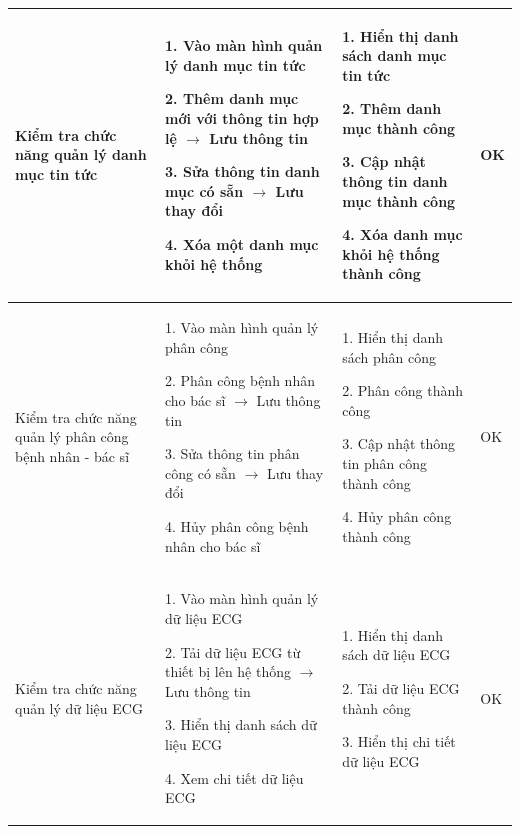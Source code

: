 \begin{xltabular}{\textwidth}{
  | >{\raggedright\arraybackslash}m{2cm}
  | >{\raggedright\arraybackslash}X
  | >{\raggedright\arraybackslash}X
  | >{\raggedright\arraybackslash}m{1cm}|
  }
  Kiểm tra chức năng quản lý danh mục tin tức
  & 
 
  1. Vào màn hình quản lý danh mục tin tức 

  2. Thêm danh mục mới với thông tin hợp lệ $\rightarrow$ Lưu thông tin

  3. Sửa thông tin danh mục có sẵn $\rightarrow$ Lưu thay đổi

  4. Xóa một danh mục khỏi hệ thống


  & 

1. Hiển thị danh sách danh mục tin tức

2. Thêm danh mục thành công

3. Cập nhật thông tin danh mục thành công

4. Xóa danh mục khỏi hệ thống thành công

  & OK

  \\ \hline

  Kiểm tra chức năng quản lý phân công bệnh nhân - bác sĩ
  & 
 
  1. Vào màn hình quản lý phân công 

  2. Phân công bệnh nhân cho bác sĩ $\rightarrow$ Lưu thông tin

  3. Sửa thông tin phân công có sẵn $\rightarrow$ Lưu thay đổi

  4. Hủy phân công bệnh nhân cho bác sĩ

  & 

1. Hiển thị danh sách phân công

2. Phân công thành công

3. Cập nhật thông tin phân công thành công

4. Hủy phân công thành công

  & OK

  \\ \hline

  
  Kiểm tra chức năng quản lý dữ liệu ECG
  & 

1. Vào màn hình quản lý dữ liệu ECG 

2. Tải dữ liệu ECG từ thiết bị lên hệ thống $\rightarrow$ Lưu thông tin

3. Hiển thị danh sách dữ liệu ECG

4. Xem chi tiết dữ liệu ECG
 
  & 

1. Hiển thị danh sách dữ liệu ECG

2. Tải dữ liệu ECG thành công

3. Hiển thị chi tiết dữ liệu ECG

  & OK

  \\ \hline

  \end{xltabular}


